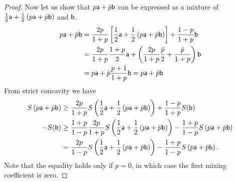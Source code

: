 \begin{proof}
	Now let us show that $p \ens[a] + \bar{p} \ens[b]$ can be expressed as a mixture of $\frac{1}{2} \ens[a] + \frac{1}{2}\left(p\ens[a] + \bar{p} \ens[b]\right)$ and $\ens[b]$.
	\begin{equation}
		\begin{aligned}
			p \ens[a] + \bar{p} \ens[b] &= \frac{2p}{1+p}\left[\frac{1}{2} \ens[a] + \frac{1}{2}\left(p\ens[a] + \bar{p} \ens[b]\right)\right] + \frac{1-p}{1+p} \ens[b] \\
			&= \frac{2p}{1+p} \frac{1+p}{2} \ens[a] + \left( \frac{2p}{1+p} \frac{\bar{p}}{2}+ \frac{\bar{p}}{1+p} \right) \ens[b] \\
			&= p \ens[a] + \bar{p} \frac{p+1}{1+p}\ens[b] = p \ens[a] +\bar{p} \ens[b]
		\end{aligned}
	\end{equation}
	From strict concavity we have
	\begin{equation}
	\begin{aligned}
		S\left(p \ens[a] + \bar{p} \ens[b] \right)&\geq \frac{2p}{1+p} S\left(\frac{1}{2} \ens[a] + \frac{1}{2}\left(p\ens[a] + \bar{p} \ens[b]\right)\right) + \frac{1-p}{1+p} S(\ens[b]) \\
		-S(\ens[b]) &\geq \frac{1+p}{1-p} \frac{2p}{1+p} S\left(\frac{1}{2} \ens[a] + \frac{1}{2}\left(p\ens[a] + \bar{p} \ens[b]\right)\right) - \frac{1+p}{1-p} S\left(p \ens[a] + \bar{p} \ens[b] \right) \\
		&= \frac{2p}{1-p} S\left(\frac{1}{2} \ens[a] + \frac{1}{2}\left(p\ens[a] + \bar{p} \ens[b]\right)\right) - \frac{1+p}{1-p} S\left(p \ens[a] + \bar{p} \ens[b] \right).
	\end{aligned}
	\end{equation}
	Note that the equality holds only if $p=0$, in which case the first mixing coefficient is zero.
	

\end{proof}
